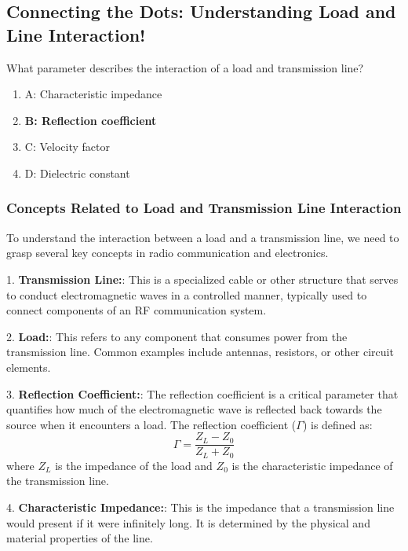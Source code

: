 \subsection{Connecting the Dots: Understanding Load and Line Interaction!}

\begin{tcolorbox}[colback=gray!10, colframe=black, title=E9E07] What parameter describes the interaction of a load and transmission line?
\begin{enumerate}
    \item A: Characteristic impedance
    \item \textbf{B: Reflection coefficient}
    \item C: Velocity factor
    \item D: Dielectric constant
\end{enumerate} \end{tcolorbox}

\subsubsection{Concepts Related to Load and Transmission Line Interaction}

To understand the interaction between a load and a transmission line, we need to grasp several key concepts in radio communication and electronics. 

1. \textbf{Transmission Line:}: This is a specialized cable or other structure that serves to conduct electromagnetic waves in a controlled manner, typically used to connect components of an RF communication system.

2. \textbf{Load:}: This refers to any component that consumes power from the transmission line. Common examples include antennas, resistors, or other circuit elements.

3. \textbf{Reflection Coefficient:}: The reflection coefficient is a critical parameter that quantifies how much of the electromagnetic wave is reflected back towards the source when it encounters a load. The reflection coefficient (\( \Gamma \)) is defined as:
   \[
   \Gamma = \frac{Z_L - Z_0}{Z_L + Z_0}
   \]
   where \( Z_L \) is the impedance of the load and \( Z_0 \) is the characteristic impedance of the transmission line. 

4. \textbf{Characteristic Impedance:}: This is the impedance that a transmission line would present if it were infinitely long. It is determined by the physical and material properties of the line.


